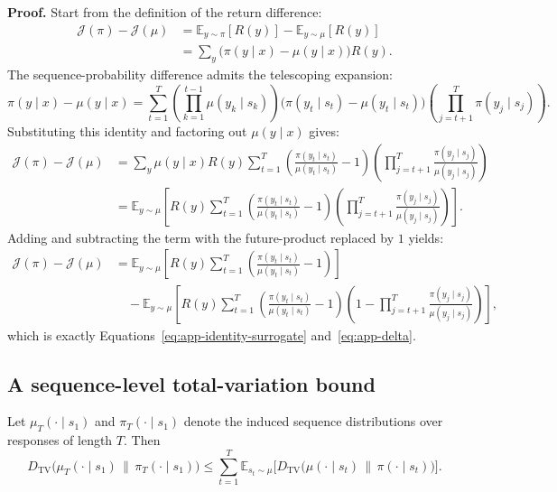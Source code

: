 \textbf{Proof.}
Start from the definition of the return difference:
\begin{align*}
\mathcal J(\pi)-\mathcal J(\mu)
&=\mathbb E_{y\sim\pi}[R(y)]-\mathbb E_{y\sim\mu}[R(y)]\\
&=\sum_{y}\bigl(\pi(y\mid x)-\mu(y\mid x)\bigr)R(y).
\end{align*}
The sequence-probability difference admits the telescoping expansion:
\begin{equation*}
\pi(y\mid x)-\mu(y\mid x)
=\sum_{t=1}^{T}\left(\prod_{k=1}^{t-1}\mu(y_k\mid s_k)\right)
\bigl(\pi(y_t\mid s_t)-\mu(y_t\mid s_t)\bigr)
\left(\prod_{j=t+1}^{T}\pi(y_j\mid s_j)\right).
\end{equation*}
Substituting this identity and factoring out $\mu(y\mid x)$ gives:
\begin{align*}
\mathcal J(\pi)-\mathcal J(\mu)
&=\sum_{y}\mu(y\mid x)R(y)
\sum_{t=1}^{T}\left(\frac{\pi(y_t\mid s_t)}{\mu(y_t\mid s_t)}-1\right)
\left(\prod_{j=t+1}^{T}\frac{\pi(y_j\mid s_j)}{\mu(y_j\mid s_j)}\right)\\
&=\mathbb E_{y\sim\mu}\left[R(y)
\sum_{t=1}^{T}\left(\frac{\pi(y_t\mid s_t)}{\mu(y_t\mid s_t)}-1\right)
\left(\prod_{j=t+1}^{T}\frac{\pi(y_j\mid s_j)}{\mu(y_j\mid s_j)}\right)
\right].
\end{align*}
Adding and subtracting the term with the future-product replaced by $1$ yields:
\begin{align*}
\mathcal J(\pi)-\mathcal J(\mu)
&=\mathbb E_{y\sim\mu}\left[R(y)\sum_{t=1}^{T}\left(\frac{\pi(y_t\mid s_t)}{\mu(y_t\mid s_t)}-1\right)\right]\\
&\quad-\mathbb E_{y\sim\mu}\left[R(y)\sum_{t=1}^{T}\left(\frac{\pi(y_t\mid s_t)}{\mu(y_t\mid s_t)}-1\right)
\left(1-\prod_{j=t+1}^{T}\frac{\pi(y_j\mid s_j)}{\mu(y_j\mid s_j)}\right)\right],
\end{align*}
which is exactly Equations~\eqref{eq:app-identity-surrogate} and~\eqref{eq:app-delta}.

\subsection{A sequence-level total-variation bound}
\label{app:sequence-tv}

\begin{lemma}
\label{lem:app-sequence-tv}
Let $\mu_T(\cdot\mid s_1)$ and $\pi_T(\cdot\mid s_1)$ denote the induced sequence distributions over responses of length $T$. Then
\begin{equation}
D_{\mathrm{TV}}\bigl(\mu_T(\cdot\mid s_1)\,\|\,\pi_T(\cdot\mid s_1)\bigr)
\le
\sum_{t=1}^{T}\mathbb E_{s_t\sim\mu}\Big[D_{\mathrm{TV}}\bigl(\mu(\cdot\mid s_t)\,\|\,\pi(\cdot\mid s_t)\bigr)\Big].
\label{eq:app-sequence-tv}
\end{equation}
\end{lemma}


